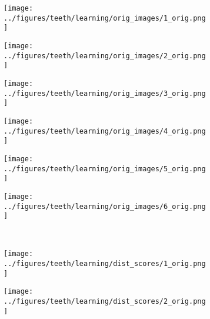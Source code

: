 \begin{figure}[h!]
	\begin{subfigure}[b]{0.03\textwidth} %
		\centering
	\end{subfigure}
	\begin{subfigure}{0.15\textwidth}
		\centering
		\texttt{[image: ../figures/teeth/learning/orig\_images/1\_orig.png]}
		\label{fig:1}
	\end{subfigure}
	\begin{subfigure}{0.15\textwidth}
		\centering
		\texttt{[image: ../figures/teeth/learning/orig\_images/2\_orig.png]}
		\label{fig:1}
	\end{subfigure}
	\begin{subfigure}{0.15\textwidth}
		\centering
		\texttt{[image: ../figures/teeth/learning/orig\_images/3\_orig.png]}
		\label{fig:1}
	\end{subfigure}
	\begin{subfigure}{0.15\textwidth}
		\centering
		\texttt{[image: ../figures/teeth/learning/orig\_images/4\_orig.png]}
		\label{fig:1}
	\end{subfigure}
	\begin{subfigure}{0.15\textwidth}
		\centering
		\texttt{[image: ../figures/teeth/learning/orig\_images/5\_orig.png]}
		\label{fig:1}
	\end{subfigure}
	\begin{subfigure}{0.15\textwidth}
		\centering
		\texttt{[image: ../figures/teeth/learning/orig\_images/6\_orig.png]}
		\label{fig:1}
	\end{subfigure}
	\vspace{-0.35cm}
	\\
	\begin{subfigure}[b]{0.03\textwidth} %
		\centering
	\end{subfigure}
	\begin{subfigure}{0.15\textwidth}
		\centering
		\texttt{[image: ../figures/teeth/learning/dist\_scores/1\_orig.png]}
		\label{fig:1}
	\end{subfigure}
	\begin{subfigure}{0.15\textwidth}
		\centering
		\texttt{[image: ../figures/teeth/learning/dist\_scores/2\_orig.png]}
		\label{fig:1}

\end{subfigure}
\end{figure}
